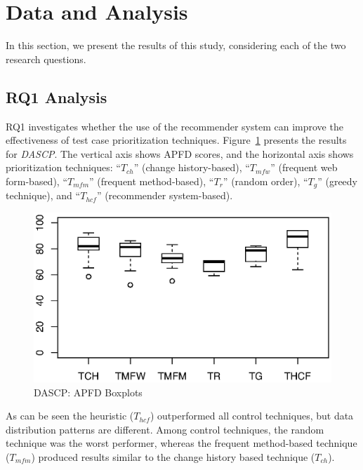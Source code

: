 \section{Data and Analysis}
\label{sec:data}

In this section, we present the results of this study, considering
each of the two research questions. 

\subsection{RQ1 Analysis}

RQ1 investigates whether the use of the recommender system can 
improve the effectiveness of test case prioritization techniques.
Figure~\ref{fig:DASCP} presents the results for {\em DASCP}.
The vertical axis shows APFD scores, and the horizontal axis shows 
prioritization techniques:
``$T_{ch}$'' (change history-based), ``$T_{mfw}$'' (frequent web form-based), 
``$T_{mfm}$'' (frequent method-based), ``$T_{r}$'' (random order), 
``$T_{g}$'' (greedy technique), and 
``$T_{hcf}$'' (recommender system-based). 

\begin{figure}[!ht]
\vspace*{-10pt}
	\centering
	\includegraphics[width=0.90\linewidth]{./DASCPWGupdated.eps}
	\vspace*{-3pt}
	\caption{DASCP: APFD Boxplots}
	\label{fig:DASCP}
\end{figure}

As can be seen the heuristic ($T_{hcf}$) outperformed all control techniques,
but data distribution patterns are different.  
Among control techniques, the random technique was 
the worst performer, whereas the frequent method-based technique ($T_{mfm}$)
produced results similar to the change history based technique ($T_{ch}$).


